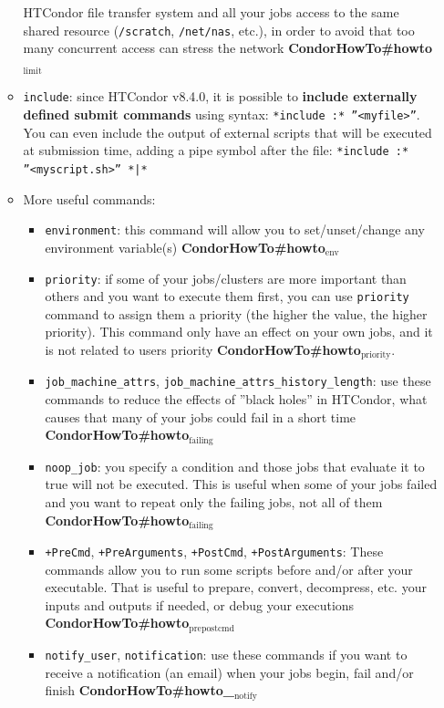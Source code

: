 \documentclass[a4paper,10pt]{article}
\begin{document}
\begin{itemize}
\begin{itemize}
HTCondor file transfer system and all your jobs access to the same shared
resource (\texttt{/scratch}, \texttt{/net/nas}, etc.), in order to avoid that too many
concurrent access can stress the network \textbf{CondorHowTo\#howto\(_{\text{limit}}\)}
\item \texttt{include}: since HTCondor v8.4.0, it is possible to \textbf{include externally
defined submit commands} using syntax: \texttt{*include :* ''<myfile>''}. You can
even include the output of external scripts that will be executed at
submission time, adding a pipe symbol after the file: \texttt{*include :*
    ''<myscript.sh>'' *|*}
\item More useful commands:
\begin{itemize}
\item \texttt{environment}: this command will allow you to set/unset/change any
environment variable(s) \textbf{CondorHowTo\#howto\(_{\text{env}}\)}
\item \texttt{priority}: if some of your jobs/clusters are more important than others
and you want to execute them first, you can use \texttt{priority} command to
assign them a priority (the higher the value, the higher priority). This
command only have an effect on your own jobs, and it is not related to
users priority \textbf{CondorHowTo\#howto\(_{\text{priority}}\)}.
\item \texttt{job\_machine\_attrs}, \texttt{job\_machine\_attrs\_history\_length}: use these
commands to reduce the effects of ''black holes'' in HTCondor, what causes
that many of your jobs could fail in a short time
\textbf{CondorHowTo\#howto\(_{\text{failing}}\)}
\item \texttt{noop\_job}: you specify a condition and those jobs that evaluate it to
true will not be executed. This is useful when some of your jobs failed
and you want to repeat only the failing jobs, not all of them
\textbf{CondorHowTo\#howto\(_{\text{failing}}\)}
\item \texttt{+PreCmd}, \texttt{+PreArguments}, \texttt{+PostCmd}, \texttt{+PostArguments}: These commands
allow you to run some scripts before and/or after your executable. That is
useful to prepare, convert, decompress, etc. your inputs and outputs if
needed, or debug your executions \textbf{CondorHowTo\#howto\(_{\text{prepostcmd}}\)}
\item \texttt{notify\_user}, \texttt{notification}: use these commands if you want to receive a
notification (an email) when your jobs begin, fail and/or finish
\textbf{CondorHowTo\#howto\_\(_{\text{notify}}\)}

\end{itemize}
\end{itemize}
\end{itemize}
\end{document}
